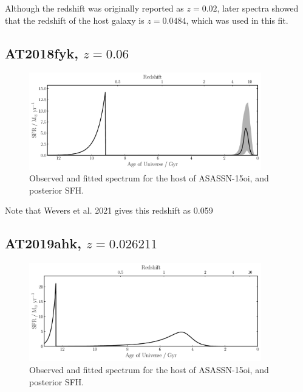 \documentclass[a4paper,11pt]{article}
\begin{document}
Although the redshift was originally reported as $z=0.02$, later spectra showed that the redshift of the host galaxy is $z=0.0484$, which was used in this fit.\cite{Arcavi_2015, Holoien_2016b}

\newpage
\subsection{AT2018fyk, $z=0.06$}\label{sec:AT2018fyk}
\begin{figure}[h!]
\centering
  \includegraphics[width=0.9\textwidth]{../pipes/plots/r4_dblplaw_burst/AT2018fyk_sfh.pdf}
  \caption{Observed and fitted spectrum for the host of ASASSN-15oi, and posterior SFH.}
  \label{}
\end{figure}


Note that Wevers et al. 2021 gives this redshift as 0.059

\newpage
\subsection{AT2019ahk, $z=0.026211$}\label{sec:AT2019ahk}
\begin{figure}[h!]
\centering
  \includegraphics[width=0.9\textwidth]{../pipes/plots/r4_dblplaw_burst/AT2019ahk_sfh.pdf}
  \caption{Observed and fitted spectrum for the host of ASASSN-15oi, and posterior SFH.}
  \label{}
\end{figure}


\newpage
\end{document}

